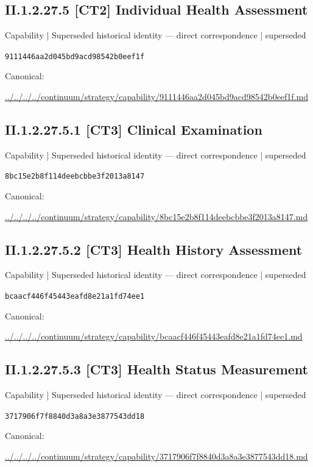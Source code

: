 \documentclass[10pt,a4paper]{article}
\begin{document}
\subsection*{II.1.2.27.5 [CT2] Individual Health Assessment}
{\small Capability | Superseded historical identity — direct correspondence | superseded}\par
\texttt{9111446aa2d045bd9acd98542b0eef1f}\par
Canonical: \par
{\footnotesize\url{../../../../continuum/strategy/capability/9111446aa2d045bd9acd98542b0eef1f.md}}\par
\subsection*{II.1.2.27.5.1 [CT3] Clinical Examination}
{\small Capability | Superseded historical identity — direct correspondence | superseded}\par
\texttt{8bc15e2b8f114deebcbbe3f2013a8147}\par
Canonical: \par
{\footnotesize\url{../../../../continuum/strategy/capability/8bc15e2b8f114deebcbbe3f2013a8147.md}}\par
\subsection*{II.1.2.27.5.2 [CT3] Health History Assessment}
{\small Capability | Superseded historical identity — direct correspondence | superseded}\par
\texttt{bcaacf446f45443eafd8e21a1fd74ee1}\par
Canonical: \par
{\footnotesize\url{../../../../continuum/strategy/capability/bcaacf446f45443eafd8e21a1fd74ee1.md}}\par
\subsection*{II.1.2.27.5.3 [CT3] Health Status Measurement}
{\small Capability | Superseded historical identity — direct correspondence | superseded}\par
\texttt{3717906f7f8840d3a8a3e3877543dd18}\par
Canonical: \par
{\footnotesize\url{../../../../continuum/strategy/capability/3717906f7f8840d3a8a3e3877543dd18.md}}\par
\end{document}
